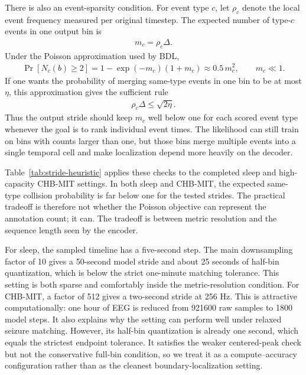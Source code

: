 There is also an event-sparsity condition.
For event type $c$, let $\rho_c$ denote the local event frequency measured
per original timestep.
The expected number of type-$c$ events in one output bin is
\begin{align}
    m_c = \rho_c\Delta.
\end{align}
Under the Poisson approximation used by BDL,
\begin{align}
    \Pr[N_c(b)\ge 2]
    =
    1 - \exp(-m_c)(1+m_c)
    \approx
    0.5\,m_c^2,
    \qquad m_c \ll 1.
\end{align}
If one wants the probability of merging same-type events in one bin to be
at most $\eta$, this approximation gives the sufficient rule
\begin{align}
    \rho_c\Delta \le \sqrt{2\eta}.
\end{align}
Thus the output stride should keep $m_c$ well below one for each scored event
type whenever the goal is to rank individual event times.
The likelihood can still train on bins with counts larger than one, but those
bins merge multiple events into a single temporal cell and make
localization depend more heavily on the decoder.

Table~\ref{tab:stride-heuristic} applies these checks to the completed sleep
and high-capacity CHB-MIT settings.
In both sleep and CHB-MIT, the expected same-type collision probability is far
below one for the tested strides.
The practical tradeoff is therefore not whether the Poisson objective can represent
the annotation count; it can.
The tradeoff is between metric resolution and the sequence length seen by the
encoder.

For sleep, the sampled timeline has a five-second step.
The main downsampling factor of 10 gives a 50-second model stride and about
25 seconds of half-bin quantization, which is below the strict one-minute
matching tolerance.
This setting is both sparse and comfortably inside the metric-resolution
condition.
For CHB-MIT, a factor of 512 gives a two-second stride at 256 Hz.
This is attractive computationally: one hour of EEG is reduced from 921600 raw
samples to 1800 model steps.
It also explains why the setting can perform well under relaxed seizure
matching.
However, its half-bin quantization is already one second, which equals the
strictest endpoint tolerance.
It satisfies the weaker centered-peak check but not the conservative full-bin
condition, so we treat it as a compute--accuracy configuration rather than as
the cleanest boundary-localization setting.

